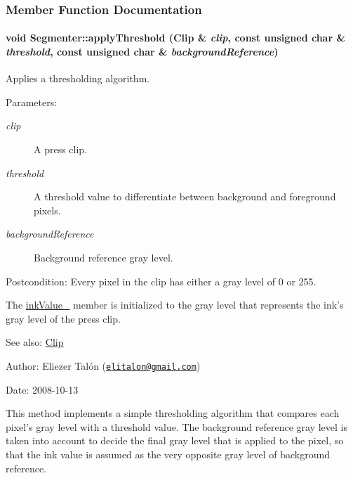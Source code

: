 \subsubsection{Member Function Documentation}
\hypertarget{class_segmenter_6854315e3320f9d9a8ece14cbb8570ee}{
\paragraph[{applyThreshold}]{\setlength{\rightskip}{0pt plus 5cm}void Segmenter::applyThreshold ({\bf Clip} \& {\em clip}, \/  const unsigned char \& {\em threshold}, \/  const unsigned char \& {\em backgroundReference})}\hfill}
\label{class_segmenter_6854315e3320f9d9a8ece14cbb8570ee}


Applies a thresholding algorithm. 

\begin{Desc}
\item[Parameters:]
\begin{description}
\item[{\em clip}]A press clip. \item[{\em threshold}]A threshold value to differentiate between background and foreground pixels. \item[{\em backgroundReference}]Background reference gray level.\end{description}
\end{Desc}
\begin{Desc}
\item[Postcondition:]Every pixel in the clip has either a gray level of 0 or 255. 

The \hyperlink{class_segmenter_fa6183f99aa6011399783652b341a43b}{inkValue\_\-} member is initialized to the gray level that represents the ink's gray level of the press clip.\end{Desc}
\begin{Desc}
\item[See also:]\hyperlink{class_clip}{Clip}\end{Desc}
\begin{Desc}
\item[Author:]Eliezer Talón (\href{mailto:elitalon@gmail.com}{\tt elitalon@gmail.com}) \end{Desc}
\begin{Desc}
\item[Date:]2008-10-13\end{Desc}
This method implements a simple thresholding algorithm that compares each pixel's gray level with a threshold value. The background reference gray level is taken into account to decide the final gray level that is applied to the pixel, so that the ink value is assumed as the very opposite gray level of background reference. 

